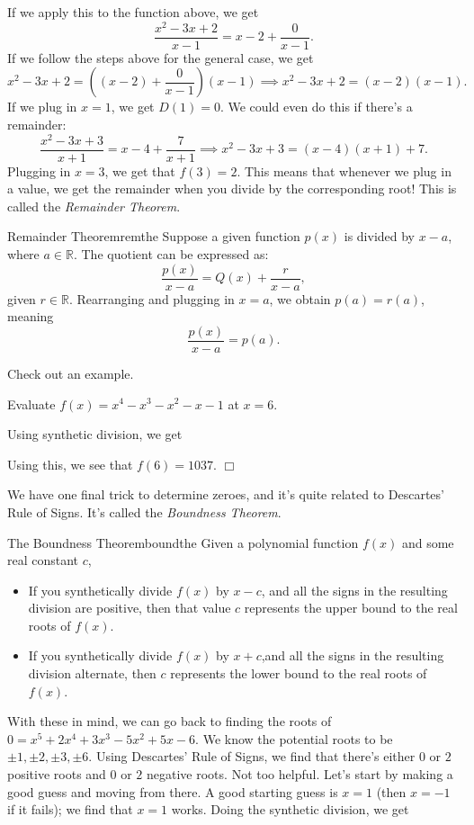 \documentclass[../book.tex]{subfiles}
\begin{document}
If we apply this to the function above, we get $$\dfrac{x^2-3x+2}{x-1}=x-2+\dfrac{0}{x-1}.$$ If we follow the steps above for the general case, we get $$x^2-3x+2=\left((x-2)+\dfrac{0}{x-1}\right)(x-1) \implies x^2-3x+2=(x-2)(x-1).$$ If we plug in $x=1$, we get $D(1)=0.$ We could even do this if there's a remainder: $$\dfrac{x^2-3x+3}{x+1}=x-4+\frac{7}{x+1} \implies x^2-3x+3=(x-4)(x+1)+7.$$ Plugging in $x=3$, we get that $f(3)=2$. This means that whenever we plug in a value, we get the remainder when you divide by the corresponding root! This is called the \textit{Remainder Theorem}.
\begin{theorem}{Remainder Theorem}{remthe}
Suppose a given function $p(x)$ is divided by $x-a$, where $a\in\mathbb{R}$. The quotient can be expressed as: $$\dfrac{p(x)}{x-a}=Q(x)+\dfrac{r}{x-a},$$ given $r\in\mathbb{R}$. Rearranging and plugging in $x=a$, we obtain $p(a)=r(a)$, meaning $$\dfrac{p(x)}{x-a}=p(a).$$
\end{theorem}
Check out an example.
\begin{example}
Evaluate $f(x)=x^4-x^3-x^2-x-1$ at $x=6$.
\end{example}
\begin{solution}
Using synthetic division, we get


Using this, we see that $f(6)=1037$. $\Box$
\end{solution}
We have one final trick to determine zeroes, and it's quite related to Descartes' Rule of Signs.  It's called the \textit{Boundness Theorem}.
\begin{theorem}{The Boundness Theorem}{boundthe}
Given a polynomial function $f(x)$ and some real constant $c$, \begin{itemize}
    \item If you synthetically divide $f(x)$ by $x-c$, and all the signs in the resulting division are positive, then that value $c$ represents the upper bound to the real roots of $f(x)$.
    \item If you synthetically divide $f(x)$ by $x+c$,and all the signs in the resulting division alternate, then $c$ represents the lower bound to the real roots of $f(x)$.
\end{itemize}
\end{theorem}
With these in mind, we can go back to finding the roots of $0=x^5+2x^4+3x^3-5x^2+5x-6$.  We know the potential roots to be $\pm 1,\pm 2,\pm 3,\pm 6$.  Using Descartes' Rule of Signs, we find that there's either $0$ or $2$ positive roots and $0$ or $2$ negative roots.  Not too helpful.  Let's start by making a good guess and moving from there.  A good starting guess is $x=1$ (then $x=-1$ if it fails); we find that $x=1$ works.  Doing the synthetic division, we get
\end{document}
